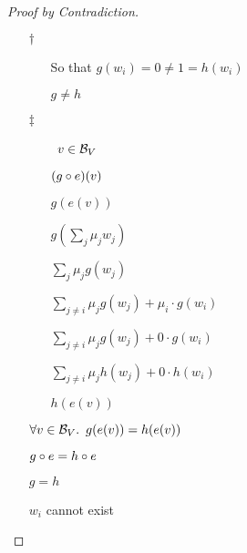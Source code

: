 \begin{lemma}
\begin{proof}[Proof by Contradiction]
\begin{itemize}
      \item[$\dagger$]
        \begin{itemize}
          \item[\phs] So that $g(w_i) = 0 \neq 1 = h(w_i)$
          \item[\imps] $g \neq h$
        \end{itemize}

      \item[$\ddagger$]
        \begin{itemize}
          \item[\phs]
            \Let~$v\in\mathcal{B}_{V}$
            \marginnote{\Hyp}

          \item[\phs] $(g\circ e)(v)$

          \item[\eqs] $g(e(v))$
            \marginnote{\Def-$\compose$}

          \item[\eqs]
            $g(\sum_j\mu_jw_j)$

          \item[\eqs]
            $\sum_j\mu_jg(w_j)$

          \item[\eqs]
            $\sum_{j\neq i}\mu_jg(w_j) + \mu_i\cdot g(w_i)$

          \item[\eqs]
            $\sum_{j\neq i}\mu_jg(w_j) + 0\cdot g(w_i)$
            \marginnote{$\forall$-\Elim-$\star$}

          \item[\eqs]
            $\sum_{j\neq i}\mu_jh(w_j) + 0\cdot h(w_i)$

          \item[\eqs]
            $h(e(v))$
        \end{itemize}

        \item[\imps]
          $\forall v\in\mathcal{B}_{V}\ldotp~g(e(v))=h(e(v))$
          \marginnote{$\forall$-\Intro-$\ddagger$}

        \item[\imps]
          $g\circ e = h\circ e$
          \marginnote{\Def-$=$}

        \item[\imps]
          $g = h$

        \item[\contras]
          $w_i$ cannot exist
          \marginnote{\Contra-$\dagger$}
          \qedhere
    \end{itemize}
  \end{proof}
\end{lemma}

